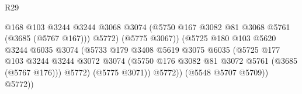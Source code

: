 \begin{lexlean}{R29}
\begin{coremodule}
                                                @168
                                                @103
                                                @3244
                                                @3244
                                                @3068
                                                @3074
                                                (@5750
                                                  @167
                                                  @3082
                                                  @81
                                                  @3068
                                                  @5761
                                                  (@3685 (@5767 @167)))
                                                @5772)
                                              (@5775 @3067))
                                            (@5725
                                              @180
                                              @103
                                              @5620
                                              @3244
                                              @6035
                                              @3074
                                              (@5733
                                                @179
                                                @3408
                                                @5619
                                                @3075
                                                @6035
                                                (@5725
                                                  @177
                                                  @103
                                                  @3244
                                                  @3244
                                                  @3072
                                                  @3074
                                                  (@5750
                                                    @176
                                                    @3082
                                                    @81
                                                    @3072
                                                    @5761
                                                    (@3685 (@5767 @176)))
                                                  @5772)
                                                (@5775 @3071))
                                              @5772))
                                          (@5548 @5707 @5709))
                                        @5772))

\end{coremodule}
\end{lexlean}
